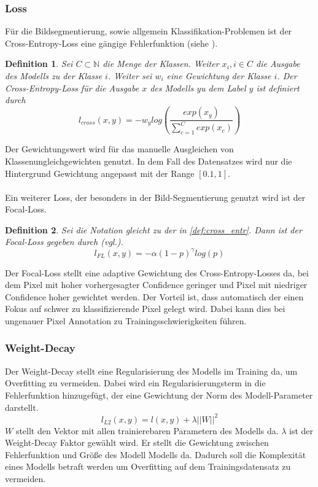\documentclass[12pt,DIV=15,BCOR=15mm,twoside,headsepline,abstract=true,listof=totoc,bibliography=totoc]{scrreprt}
\newtheorem{defi}{Definition}
\theoremstyle{remark}    %
\begin{document}
    \subsubsection{Loss}
    Für die Bildsegmentierung, sowie allgemein Klassifikation-Problemen ist der Cross-Entropy-Loss eine gängige Fehlerfunktion 
    (siehe \cite{chen2017rethinkingatrousconvolutionsemantic}).
    \begin{defi}
    Sei $C \subset \mathbb{N}$ die Menge der Klassen. Weiter $x_i, i \in C$ die Ausgabe des Modells zu der Klasse $i$. 
    Weiter sei $w_i$ eine Gewichtung der Klasse $i$. Der Cross-Entropy-Loss für die Ausgabe $x$ des Modells yu dem Label $y$ ist definiert durch
    \begin{equation}\label{def:cross_entr}
        l_{cross}(x,y) = -w_{y} log\left(\frac{exp(x_{y})}{\sum_{c=1}^{C}exp(x_{c})}\right)
    \end{equation}
    \end{defi}\noindent
    Der Gewichtungswert wird für das manuelle Ausgleichen von Klassenungleichgewichten genutzt. In dem Fall des Datensatzes wird nur die Hintergrund 
    Gewichtung angepasst mit der Range $[0.1,1]$.\\\\
    Ein weiterer Loss, der besonders in der Bild-Segmentierung genutzt wird ist der Focal-Loss.
    \begin{defi}
    Sei die Notation gleicht zu der in \ref{def:cross_entr}. Dann ist der Focal-Loss gegeben durch (vgl.\cite{lin2018focallossdenseobject}). 
    \begin{equation}
        l_{FL}(x,y) = -\alpha (1-p)^{\gamma}log (p)
    \end{equation} 
    \end{defi}\noindent
    Der Focal-Loss stellt eine adaptive Gewichtung des Cross-Entropy-Losses da, bei dem Pixel mit hoher vorhergesagter Confidence geringer und Pixel mit 
    niedriger Confidence hoher gewichtet werden. Der Vorteil ist, dass automatisch der einen Fokus auf schwer zu klassifizierende Pixel gelegt wird. Dabei 
    kann dies bei ungenauer Pixel Annotation zu Trainingsschwierigkeiten führen.
    \subsubsection{Weight-Decay}
    Der Weight-Decay stellt eine Regularisierung des Modells im Training da, um Overfitting zu vermeiden. Dabei wird ein Regularisierungsterm in die Fehlerfunktion
    hinzugefügt, der eine Gewichtung der Norm des Modell-Parameter darstellt.  
    \begin{equation}
        l_{L2}(x,y) = l(x,y) + \lambda ||W||^2
    \end{equation}
    $W$ stellt den Vektor mit allen trainierebaren Parametern des Modells da. $\lambda$ ist der Weight-Decay Faktor gewählt wird. Er stellt die Gewichtung zwischen 
    Fehlerfunktion und Größe des Modell Modells da. Dadurch soll die Komplexität eines Modells betraft werden um Overfitting  auf dem Trainingsdatensatz zu vermeiden.
\end{document}
